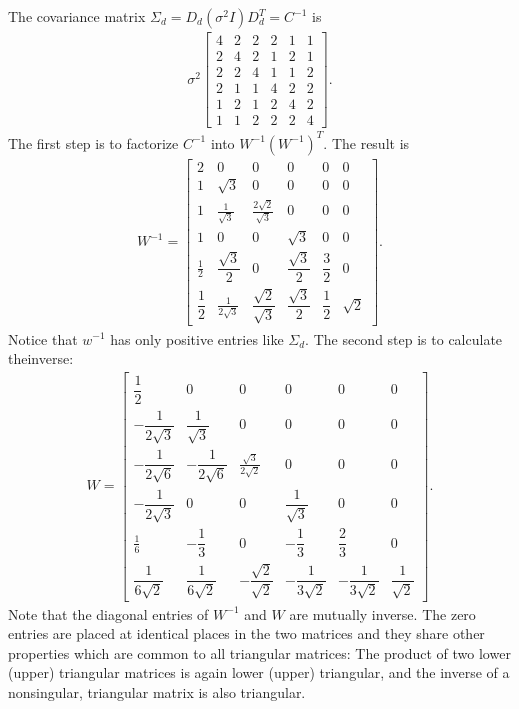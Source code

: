 The covariance matrix $ \Sigma_{d} = D_{d}(\sigma^{2}I)D^{T}_{d} = C^{-1}$ is
\begin{align*}
\sigma^{2}
\begin{bmatrix}
4 & 2 & 2 & 2 & 1 & 1 \\
2 & 4 & 2 & 1 & 2 & 1 \\
2 & 2 & 4 & 1 & 1 & 2 \\
2 & 1 & 1 & 4 & 2 & 2 \\
1 & 2 & 1 & 2 & 4 & 2 \\
1 & 1 & 2 & 2 & 2 & 4 
\end{bmatrix}.
\end{align*}
The first step is to factorize $C^{-1}$ into $ W^{-1} (W^{-1} )^{T}$. The result is
\begin{align*}
W^{-1} = 
\begin{bmatrix}
2 & 0 & 0 & 0 & 0 & 0 \\
1 & \sqrt{3} & 0 & 0 & 0 & 0 \\
1 & \frac{1}{\sqrt{3}} & \frac{2\sqrt{2}}{\sqrt{3}} & 0 & 0 & 0 \\
1 & 0 & 0 & \sqrt{3} & 0 & 0 \\
\frac{1}{2} & \dfrac{\sqrt{3}}{2} & 0 & \dfrac{\sqrt{3}}{2} & \dfrac{3}{2} & 0 \\
\dfrac{1}{2} & \frac{1}{2\sqrt{3}} & \dfrac{\sqrt{2}}{\sqrt{3}} & \dfrac{\sqrt{3}}{2} & \dfrac{1}{2} & \sqrt{2} 
\end{bmatrix}.
\end{align*}
Notice that $w^{-1}$ has only positive entries like $ \Sigma_{d}$. The second step is to calculate theinverse:
\begin{align*}
W = 
\begin{bmatrix}
\dfrac{1}{2} & 0 & 0 & 0 & 0 & 0 \\
-\dfrac{1}{2\sqrt{3}} & \dfrac{1}{\sqrt{3}} & 0 & 0 & 0 & 0 \\
-\dfrac{1}{2\sqrt{6}} & -\dfrac{1}{2\sqrt{6}} & \frac{\sqrt{3}}{2\sqrt{2}} & 0 & 0 & 0 \\
-\dfrac{1}{2\sqrt{3}} & 0 & 0 & \dfrac{1}{\sqrt{3}} & 0 & 0 \\
\frac{1}{6} & -\dfrac{1}{3} & 0 & -\dfrac{1}{3} & \dfrac{2}{3} & 0 \\
\dfrac{1}{6\sqrt{2}} & \dfrac{1}{6\sqrt{2}} & -\dfrac{\sqrt{2}}{\sqrt{2}} & -\dfrac{1}{3\sqrt{2}} & -\dfrac{1}{3\sqrt{2}} & \dfrac{1}{\sqrt{2}} 
\end{bmatrix}.
\end{align*}
Note that the diagonal entries of $W^{-1}$ and $W $ are mutually inverse. The zero entries are placed at identical places in the two matrices and they share other properties which are common to all triangular matrices: The product of two lower (upper) triangular matrices is again lower (upper) triangular, and the inverse of a nonsingular, triangular matrix is also triangular.

